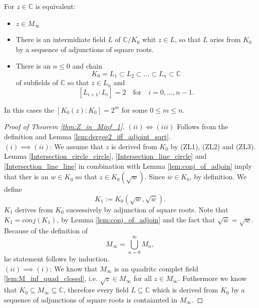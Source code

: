 
\begin{theorem}
    For $z \in \mathbb{C}$ is equivalent:
    \begin{itemize}
        \item $z \in M_{\infty}$
        \item There is an intermidiate field $L$ of $\mathbb{C}/K_0$ whit $z \in L$, so that $L$ aries from $K_0$ by a sequence of adjunctions of square roots.
        \item There is an $n\le 0$ and chain 
            $$K_0 = L_1 \subset L_2 \subset \ldots \subset L_n \subset \mathbb{C}$$
            of subfields of $\mathbb{C}$ so that $z \in L_n$ and 
            $$ [L_{i+1}:L_i] = 2 \quad \text{for} \quad i = 0, \ldots, n-1.$$
    \end{itemize}
\end{theorem}

\begin{remark}
    In this cases the $[K_0(z):K_0] = 2^m$ for some $0 \le m \le n$.
\end{remark}
\begin{proof}[Proof of Theorem \ref{thm:Z_in_Minf_1}]
    $(ii) \iff (iii)$ Follows from the definition and Lemma \ref{lem:dergee2_iff_adjoint_sqrt}.\\
    $(i) \implies (ii)$: We assume that $z$ is derived from $K_0$ by (ZL1), (ZL2) and (ZL3). %
    Lemma \ref{Intersection_circle_circle}, \ref{Intersection_line_circle} and \ref{Intersection_line_line} in combination with Lemma \ref{lem:conj_of_adjoin} 
    imply that ther is an $w \in K_0$ so that $z \in K_0(\sqrt{w})$. Since $\overline{w} \in K_0$, by definition. We define
    $$K_1 := K_0(\sqrt{w},\sqrt{\overline{w}}).$$
    $K_1$ derives from $K_0$ sucsessively by adjunction of square roots. Note that $K_1 = conj(K_1)$, by Lemma \ref{lem:conj_of_adjoin} and the fact that $\sqrt{\overline{w}} = \overline{\sqrt{w}}$.
    Because of the definition of $$M_{\infty} = \bigcup_{n=0}^{\infty} M_n,$$
    he statement follows by induction.\\ %
    $(ii) \implies (i)$: We know that $M_{\infty}$ is an quadritc complet field \ref{lem:M_inf_quad_closed}, i.e. $\sqrt{z} \in M_{\infty}$ for all $z \in M_{\infty}$.
    Futhermore we know that $K_0\subseteq M_{\infty} \subseteq \mathbb{C}$, %
    therefore every field $L\subseteq \mathbb{C}$ which is derived from $K_0$ by a sequence of adjunctions of square roots is contaianted in $M_{\infty}$.
\end{proof}